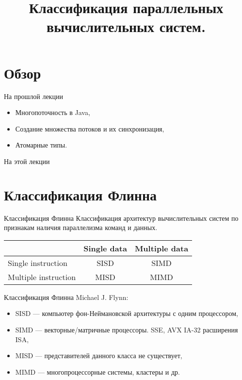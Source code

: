 

\title{Классификация параллельных вычислительных систем.}



\begin{frame}
\titlepage
\end{frame}

\section*{Обзор}

\begin{frame}{На прошлой лекции}
\begin{itemize}
\ifsbertech
    \item Многопоточность в Java,
    \item Создание множества потоков и их синхронизация,
    \item Атомарные типы.
\fi
\end{itemize}
\end{frame}

\begin{frame}{На этой лекции}
\tableofcontents
\end{frame}

\section{Классификация Флинна}

\begin{frame}{Классификация Флинна}
Классификация архитектур вычислительных систем по признакам наличия параллелизма
команд и данных.
\begin{table}[htp]
    \begin{center}
    \begin{tabular}{|l|c|c|}
        \hline
                                & Single data   & Multiple data \\
        \hline
        Single instruction      & SISD          & SIMD \\
        \hline
        Multiple instruction    & MISD          & MIMD \\
        \hline
    \end{tabular}
    \end{center}
\end{table}
\end{frame}

\begin{frame}{Классификация Флинна}
Michael J. Flynn:
\vfill
\begin{itemize}
    \item SISD --- компьютер фон-Неймановской архитектуры с одним процессором,
    \item SIMD --- векторные/матричные процессоры. SSE, AVX IA-32 расширения ISA,
    \item MISD --- представителей данного класса не существует,
    \item MIMD --- многопроцессорные системы, кластеры и др.
\end{itemize}
\end{frame}

